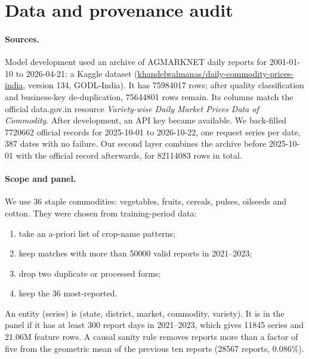 \section{Data and provenance audit}\label{sec:data}

\paragraph{Sources.}
Model development used an archive of AGMARKNET daily reports for 2001-01-10 to 2026-04-21: a Kaggle dataset (\url{khandelwalmanas/daily-commodity-prices-india}, version 134, GODL-India).
It has \num{75984017} rows; after quality classification and business-key de-duplication, \num{75644801} rows remain.
Its columns match the official data.gov.in resource \emph{Variety-wise Daily Market Prices Data of Commodity}.
After development, an API key became available. We back-filled \num{7720662} official records for 2025-10-01 to 2026-10-22, one request series per date, 387 dates with no failure.
Our second layer combines the archive before 2025-10-01 with the official record afterwards, for \num{82114083} rows in total.

\paragraph{Scope and panel.}
We use 36 staple commodities: vegetables, fruits, cereals, pulses, oilseeds and cotton.
They were chosen from training-period data:
\begin{enumerate}
  \item take an a-priori list of crop-name patterns;
  \item keep matches with more than \num{50000} valid reports in 2021--2023;
  \item drop two duplicate or processed forms;
  \item keep the 36 most-reported.
\end{enumerate}
An entity (series) is (state, district, market, commodity, variety).
It is in the panel if it has at least 300 report days in 2021--2023, which gives \num{11845} series and \num{21.06}M feature rows.
A causal sanity rule removes reports more than a factor of five from the geometric mean of the previous ten reports (\num{28567} reports, 0.086\%).

